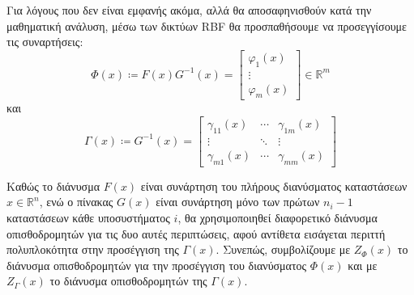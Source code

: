 Για λόγους που δεν είναι εμφανής ακόμα, αλλά θα αποσαφηνισθούν κατά την μαθηματική ανάλυση, μέσω των δικτύων RBF θα προσπαθήσουμε να προσεγγίσουμε τις συναρτήσεις:
\begin{equation}
	\Phi(x) \coloneqq F(x)G^{-1}(x) = 
	\begin{bmatrix}
	\varphi_1(x) \\ \vdots \\ \varphi_m(x)
	\end{bmatrix} \in \mathbb{R}^m
	\label{eq:approximate_F}
\end{equation}
και
\begin{equation}
\Gamma(x) \coloneqq G^{-1}(x) = 
\begin{bmatrix} \gamma_{11}(x) & \cdots & \gamma_{1m}(x) \\
					 \vdots    & \ddots & \vdots         \\
				\gamma_{m1}(x) & \cdots & \gamma_{mm}(x)
\end{bmatrix}
\label{eq:approximate_G}
\end{equation}


Καθώς το διάνυσμα $F(x)$ είναι συνάρτηση του πλήρους διανύσματος καταστάσεων $x \in \mathbb{R}^n$, ενώ ο πίνακας $G(x)$ είναι συνάρτηση μόνο των πρώτων $n_i - 1$ καταστάσεων κάθε υποσυστήματος $i$, θα χρησιμοποιηθεί διαφορετικό διάνυσμα οπισθοδρομητών για τις δυο αυτές περιπτώσεις, αφού αντίθετα εισάγεται περιττή πολυπλοκότητα στην προσέγγιση της $\Gamma(x)$. Συνεπώς, συμβολίζουμε με $Z_{\varPhi}(x)$ το διάνυσμα οπισθοδρομητών για την προσέγγιση του διανύσματος $\varPhi(x)$ και με $Z_{\Gamma}(x)$ το διάνυσμα οπισθοδρομητών της $\Gamma(x)$.

